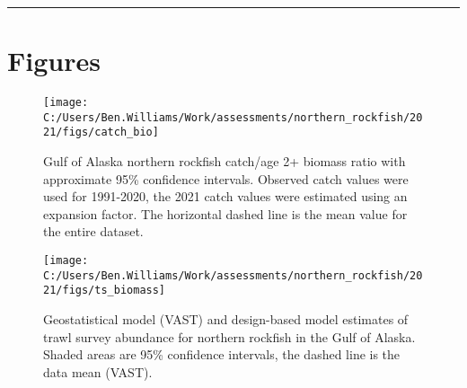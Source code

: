 \documentclass[
  11pt,
]{article}
\begin{document}
\begin{center}\rule{0.5\linewidth}{0.5pt}\end{center}

\allsectionsfont{\centering}

\hypertarget{figures}{%
\section{Figures}\label{figures}}

\begin{figure}[!h]
\texttt{[image: C:/Users/Ben.Williams/Work/assessments/northern\_rockfish/2021/figs/catch\_bio]} \caption{Gulf of Alaska northern rockfish catch/age 2+ biomass ratio with approximate 95\% confidence intervals. Observed catch values were used for 1991-2020, the 2021 catch values were estimated using an expansion factor. The horizontal dashed line is the mean value for the entire dataset.}\label{fig:fig1}
\end{figure}

\begin{figure}[!h]
\texttt{[image: C:/Users/Ben.Williams/Work/assessments/northern\_rockfish/2021/figs/ts\_biomass]} \caption{Geostatistical model (VAST) and design-based model estimates of trawl survey abundance for northern rockfish in the Gulf of Alaska. Shaded areas are 95\% confidence intervals, the dashed line is the data mean (VAST).}\label{fig:fig2}
\end{figure}

\pagebreak
\end{document}
